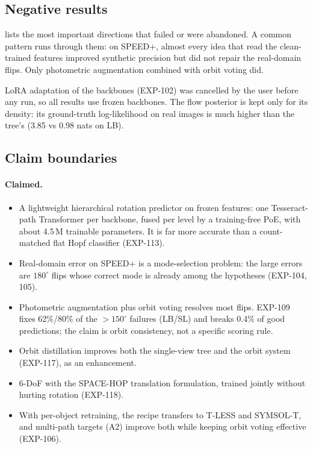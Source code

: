 \subsection{Negative results}\label{app:z_negative}

 lists the most important directions that failed or were abandoned. A common pattern runs through them: on SPEED+, almost every idea that read the clean-trained features improved synthetic precision but did not repair the real-domain flips. Only photometric augmentation combined with orbit voting did.


LoRA adaptation of the backbones (EXP-102) was cancelled by the user before any run, so all results use frozen backbones. The flow posterior is kept only for its density: its ground-truth log-likelihood on real images is much higher than the tree's (3.85 vs 0.98 nats on LB).

\subsection{Claim boundaries}\label{app:z_claims}

\paragraph{Claimed.}
\begin{itemize}
  \item A lightweight hierarchical rotation predictor on frozen features: one Tesseract-path Transformer per backbone, fused per level by a training-free PoE, with about 4.5\,M trainable parameters. It is far more accurate than a count-matched flat Hopf classifier (EXP-113).
  \item Real-domain error on SPEED+ is a mode-selection problem: the large errors are $180^\circ$ flips whose correct mode is already among the hypotheses (EXP-104, 105).
  \item Photometric augmentation plus orbit voting resolves most flips. EXP-109 fixes 62\%/80\% of the $>150^\circ$ failures (LB/SL) and breaks 0.4\% of good predictions; the claim is orbit consistency, not a specific scoring rule.
  \item Orbit distillation improves both the single-view tree and the orbit system (EXP-117), as an enhancement.
  \item 6-DoF with the SPACE-HOP translation formulation, trained jointly without hurting rotation (EXP-118).
  \item With per-object retraining, the recipe transfers to T-LESS and SYMSOL-T, and multi-path targets (A2) improve both while keeping orbit voting effective (EXP-106).
\end{itemize}

